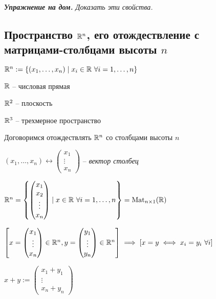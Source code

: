 \bigskip
\textit{\textbf{Упражнение на дом.} Доказать эти свойства.}

\begin{comment}
    Из свойств 1) -- 8) следует, что $\text{Mat}_{n \times m}(\RR)$ является векторным пространством над \( \RR \)
\end{comment}


\subsection{Пространство $\mathbb{R}^n$, его отождествление с матрицами-столбцами высоты $n$}

\noindent
$\mathbb{R}^n := \{(x_1, \dots, x_n) \mid x_i \in \mathbb{R} \ \forall i = 1, \dots, n \}$

$\mathbb{R}$ -- числовая прямая

$\mathbb{R}^2$ -- плоскость

$\mathbb{R}^3$ -- трехмерное пространство

\bigskip
Договоримся отождествлять \( \mathbb{R}^n \) со столбцами высоты \( n \)

$(x_1, \dots, x_n) \leftrightarrow \begin{pmatrix} x_1 \\ \vdots \\ x_n \end{pmatrix}$ -- \textit{вектор столбец}

$\mathbb{R}^n = \left\{\begin{pmatrix} x_1 \\ x_2 \\ \vdots \\ x_n \end{pmatrix} \mid x \in \mathbb{R} \ \forall i = 1, \dots, n \right\} = \text{Mat}_{n \times 1}(\mathbb{R})$

$\left[ x = \begin{pmatrix}
    x_1 \\ \vdots \\ x_n
\end{pmatrix} \in \mathbb{R}^n, y = \begin{pmatrix}
    y_1 \\ \vdots \\ y_n
\end{pmatrix} \in \mathbb{R}^n \right] \implies 
\left[ x = y \iff x_i = y_i \ \forall i \right]$

\( x + y := \begin{pmatrix}
    x_1 + y_1 \\ \vdots \\ x_n + y_n
\end{pmatrix} \)

